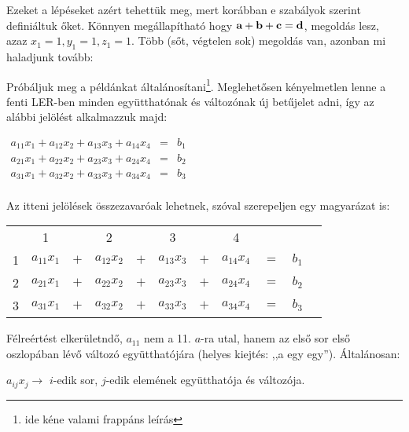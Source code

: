 \documentclass[a4paper,11.5pt]{article}
\begin{document}
	\noindent Ezeket a lépéseket azért tehettük meg, mert korábban e szabályok szerint definiáltuk őket. Könnyen megállapítható hogy $\textbf{a}+\textbf{b}+\textbf{c}=\textbf{d}$, megoldás lesz, azaz $x_1=1, y_1=1, z_1=1$. Több (sőt, végtelen sok) megoldás van, azonban mi haladjunk tovább: 
	
	\pagebreak
	Próbáljuk meg a példánkat általánosítani\footnote{ide kéne valami frappáns leírás}. Meglehetősen kényelmetlen lenne a fenti LER-ben minden együtthatónak és változónak új betűjelet adni, így az alábbi jelölést alkalmazzuk majd:
	
	\begin{center}
		$\begin{matrix}
		a_{11}x_{1} + a_{12}x_{2} + a_{13}x_{3} + a_{14}x_{4} &=& b_{1}\\
		a_{21}x_{1} + a_{22}x_{2} + a_{23}x_{3} + a_{24}x_{4} &=& b_{2}\\
		a_{31}x_{1} + a_{32}x_{2} + a_{33}x_{3} + a_{34}x_{4} &=& b_{3}\\
		\end{matrix}$
	\end{center}
	
	\noindent Az itteni jelölések összezavaróak lehetnek, szóval szerepeljen egy magyarázat is:
	
	
	\begin{center}
		\setlength{\extrarowheight}{7pt}
	\begin{tabular}{cc|c|c|c|c|c|cccc}
		&{\LARGE 1}&&{\LARGE2}&&{\LARGE3}&&{\LARGE4}&&\\
		{\LARGE 1}&$a_{11}x_{1} $&$+$&$ a_{12}x_{2}$ &$+$&$ a_{13}x_{3}$ &$+$& $a_{14}x_{4}$ &$=$& $b_{1}$\\
		\hline
		{\LARGE 2}&$a_{21}x_{1} $&$+$&$ a_{22}x_{2}$ &$+$&$ a_{23}x_{3}$ &$+$&$ a_{24}x_{4}$ &$=$& $b_{2}$\\
		\hline
		{\LARGE 3}&$a_{31}x_{1}$ &$+$& $a_{32}x_{2}$ &$+$&$ a_{33}x_{3} $&$+$&$ a_{34}x_{4}$ &$=$& $b_{3}$\\
	\end{tabular}
	\end{center}
	
	\noindent Félreértést elkerületndő, $a_{11}$ nem a 11. $a$-ra utal, hanem az első sor első oszlopában lévő változó együtthatójára (helyes kiejtés: ,,a egy egy''). Általánosan:
	
	
	\begin{center}
		$a_{ij}x_j \rightarrow$ $i$-edik sor, $j$-edik elemének együtthatója és változója.
	\end{center}
	
\end{document}
